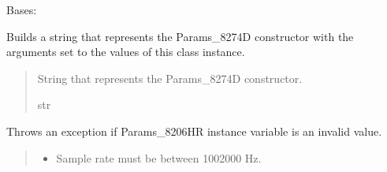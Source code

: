 \documentclass[letterpaper,10pt,english]{sphinxmanual}
\begin{document}
\begin{fulllineitems}
\label{\detokenize{PodApi.Parameters:PodApi.Parameters.Params8274D.Params8274D}}
\pysigstartsignatures
{}
\pysigstopsignatures
\sphinxAtStartPar
Bases: {\hyperref[\detokenize{PodApi.Parameters:PodApi.Parameters.ParamsBasic.Params}]{}}

\begin{fulllineitems}
\label{\detokenize{PodApi.Parameters:PodApi.Parameters.Params8274D.Params8274D.GetInit}}
\pysigstartsignatures
{}
\pysigstopsignatures
\sphinxAtStartPar
Builds a string that represents the Params\_8274D constructor with the         arguments set to the values of this class instance.
\begin{quote}\begin{description}
\sphinxAtStartPar
String that represents the Params\_8274D constructor.

\sphinxAtStartPar
str

\end{description}\end{quote}

\end{fulllineitems}


\begin{fulllineitems}
\label{\detokenize{PodApi.Parameters:PodApi.Parameters.Params8274D.Params8274D._CheckParams}}
\pysigstartsignatures
{}
\pysigstopsignatures
\sphinxAtStartPar
Throws an exception if Params\_8206HR instance variable is an invalid value.
\begin{quote}\begin{description}
\begin{itemize}
\item {} 
\sphinxAtStartPar
{} \textendash{} Sample rate must be between 100\sphinxhyphen{}2000 Hz.


\end{itemize}
\end{description}
\end{quote}
\end{fulllineitems}
\end{fulllineitems}
\end{document}
